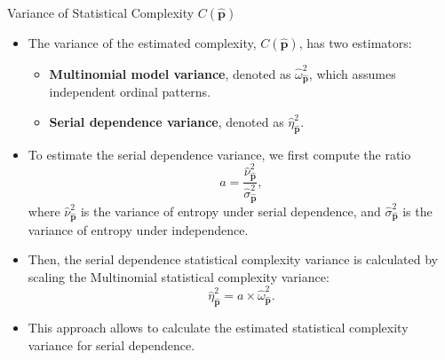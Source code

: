 \documentclass{beamer}
\begin{document}
	
	
	
	

\begin{frame}{Variance of Statistical Complexity $C(\widehat{\mathbf{p}})$}
	\begin{itemize}
		\item The variance of the estimated complexity, $C(\widehat{\mathbf{p}})$, has two estimators:
		\begin{itemize}
			\item \textbf{Multinomial model variance}, denoted as $\widehat{\omega}^2_{\widehat{\mathbf{p}}}$, which assumes independent ordinal patterns.
			\item \textbf{Serial dependence variance}, denoted as $\widehat{\eta}^2_{\widehat{\mathbf{p}}}$.
		\end{itemize}
	\end{itemize}
\end{frame}

\begin{frame}
		\begin{itemize}
		\item To estimate the serial dependence variance, we first compute the ratio
		\[
		a = \dfrac{\widehat{\nu}^2_{\widehat{\mathbf{p}}}}{\widehat{\sigma}^2_{\widehat{\mathbf{p}}}},
		\]
		where $\widehat{\nu}^2_{\widehat{\mathbf{p}}}$ is the variance of entropy under serial dependence, and $\widehat{\sigma}^2_{\widehat{\mathbf{p}}}$ is the variance of entropy under independence.
		\item Then, the serial dependence statistical complexity variance is calculated by scaling the Multinomial statistical complexity variance:
		\[
		\widehat{\eta}^2_{\widehat{\mathbf{p}}} = a \times \widehat{\omega}^2_{\widehat{\mathbf{p}}}.
		\]
		\item This approach allows to calculate the estimated statistical complexity variance for serial dependence. 
	\end{itemize}
\end{frame}
\end{document}
